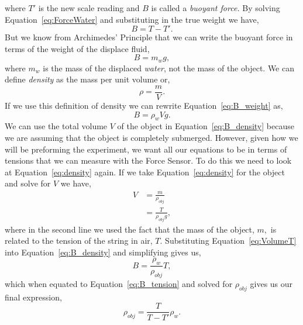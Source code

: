 \documentclass[main.tex]{subfiles}
\begin{document}
where $T'$ is the new scale reading and $B$ is called a \emph{buoyant force.} By solving Equation~\eqref{eq:ForceWater} and substituting in the true weight we have,
\begin{equation}\label{eq:B_tension}
B = T - T'.
\end{equation}
\FloatBarrier
But we know from Archimedes' Principle that we can write the buoyant force in terms of the weight of the displace fluid,
\begin{equation}\label{eq:B_weight}
B=m_w g,
\end{equation}
where $m_w$ is the mass of the displaced \emph{water}, not the mass of the object. We can define \emph{density} as the mass per unit volume or,
\begin{equation}\label{eq:density}
\rho=\frac{m}{V}.
\end{equation}
If we use this definition of density we can rewrite Equation~\eqref{eq:B_weight} as,
\begin{equation}\label{eq:B_density}
B = \rho_w V g.
\end{equation}
We can use the total volume $V$ of the object in Equation~\eqref{eq:B_density} because we are assuming that the object is completely submerged. However, given how we will be preforming the experiment, we want all our equations to be in terms of tensions that we can measure with the Force Sensor. To do this we need to look at Equation~\eqref{eq:density} again. If we take Equation~\eqref{eq:density} for the object and solve for $V$ we have,
\begin{align}
V&=\frac{m}{\rho_{obj}} \nonumber \\
&=\frac{T}{\rho_{obj}g}, \label{eq:VolumeT}
\end{align}
where in the second line we used the fact that the mass of the object, $m,$ is related to the tension of the string in air, $T.$ Substituting Equation~\eqref{eq:VolumeT} into Equation~\eqref{eq:B_density} and simplifying gives us,
\begin{equation}
B=\frac{\rho_w}{\rho_{obj}}T,
\end{equation}
which when equated to Equation~\eqref{eq:B_tension} and solved for $\rho_{obj}$ gives us our final expression,
\begin{equation} \label{eq:rho_obj}
\rho_{obj}=\frac{T}{T-T'}\rho_{w}.
\end{equation}
\end{document}
